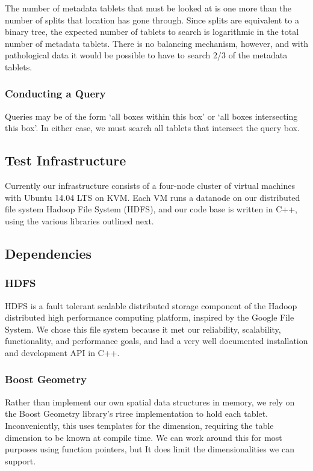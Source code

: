 \documentclass[11pt]{article}
\begin{document}
The number of metadata tablets that must be looked at is one more than the number of splits that location has gone through. Since splits are equivalent to a binary tree, the expected number of tablets to search is logarithmic in the total number of metadata tablets. There is no balancing mechanism, however, and with pathological data it would be possible to have to search 2/3 of the metadata tablets.

\subsubsection{Conducting a Query}

Queries may be of the form `all boxes within this box' or `all boxes intersecting this box'. In either case, we must search all tablets that intersect the query box. 

\subsection{Test Infrastructure}

Currently our infrastructure consists of a four-node cluster of virtual machines with Ubuntu 14.04 LTS on KVM. Each VM runs a datanode on our distributed file system Hadoop File System (HDFS), and our code base is written in C++, using the various libraries outlined next.

\subsection{Dependencies}

\subsubsection{HDFS}

HDFS is a fault tolerant scalable distributed storage component of the Hadoop distributed high performance computing platform, inspired by the Google File System. We chose this file system because it met our reliability, scalability, functionality, and performance goals, and had a very well documented installation and development API in C++. 

\subsubsection{Boost Geometry}

Rather than implement our own spatial data structures in memory, we rely on the Boost Geometry library's rtree implementation to hold each tablet. Inconveniently, this uses templates for the dimension, requiring the table dimension to be known at compile time. We can work around this for most purposes using function pointers, but It does limit the dimensionalities we can support.
\end{document}
